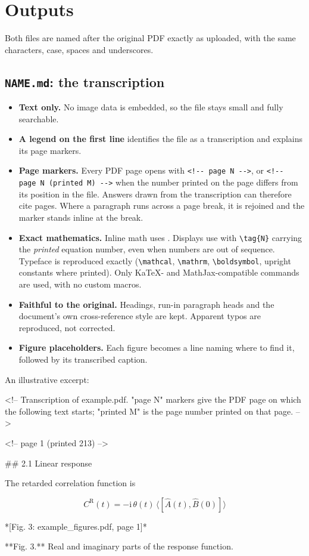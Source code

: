 \documentclass[11pt,a4paper]{article}
\begin{document}
\section{Outputs}

Both files are named after the original PDF exactly as uploaded, with the same characters,
case, spaces and underscores.

\subsection{\texorpdfstring{\texttt{NAME.md}}{NAME.md}: the transcription}
\begin{itemize}
\item \textbf{Text only.} No image data is embedded, so the file stays small and fully searchable.
\item \textbf{A legend on the first line} identifies the file as a transcription and explains its page markers.
\item \textbf{Page markers.} Every PDF page opens with \texttt{<!-{}- page N -{}->}, or
  \texttt{<!-{}- page N (printed M) -{}->} when the number printed on the page differs from its
  position in the file. Answers drawn from the transcription can therefore cite pages. Where a
  paragraph runs across a page break, it is rejoined and the marker stands inline at the break.
\item \textbf{Exact mathematics.} Inline math uses . Displays use
   with \verb|\tag{N}| carrying the \emph{printed} equation number, even
  when numbers are out of sequence. Typeface is reproduced exactly (\verb|\mathcal|,
  \verb|\mathrm|, \verb|\boldsymbol|, upright constants where printed). Only KaTeX- and
  MathJax-compatible commands are used, with no custom macros.
\item \textbf{Faithful to the original.} Headings, run-in paragraph heads and the document's
  own cross-reference style are kept. Apparent typos are reproduced, not corrected.
\item \textbf{Figure placeholders.} Each figure becomes a line naming where to find it,
  followed by its transcribed caption.
\end{itemize}

\noindent An illustrative excerpt:
\begin{cmd}
<!-- Transcription of example.pdf. "page N" markers give the PDF page on which the following text starts; "printed M" is the page number printed on that page. -->

<!-- page 1 (printed 213) -->

## 2.1 Linear response

The retarded correlation function is

$$ C^{\mathrm{R}}(t) = -\mathrm{i}\,\theta(t)\,\langle [\hat A(t), \hat B(0)] \rangle \tag{2.14} $$

*[Fig. 3: example_figures.pdf, page 1]*

**Fig. 3.** Real and imaginary parts of the response function.
\end{cmd}
\end{document}

